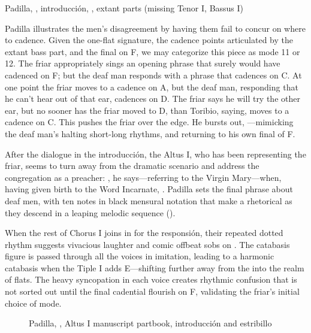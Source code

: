 \begin{exmusic}
  \caption{Padilla, , introducción, , extant parts (missing Tenor I, Bassus I)}
  \label{exmusic:Padilla-Sordo-intro}
\end{exmusic}

Padilla illustrates the men's disagreement by having them fail to concur on where to cadence.
Given the one-flat  signature, the cadence points articulated by the extant bass part, and the final on F, we may categorize this piece as mode 11 or 12.
The friar appropriately sings an opening phrase that surely would have cadenced on F; but the deaf man responds with a phrase that cadences on C.
At one point the friar moves to a cadence on A, but the deaf man, responding that he can't hear out of that ear, cadences on D.
The friar says he will try the other ear, but no sooner has the friar moved to D, than Toribio, saying,  moves to a cadence on C.
This pushes the friar over the edge.
He bursts out, ---mimicking the deaf man's halting short-long rhythms, and returning to his own final of F.

After the dialogue in the introducción, the Altus I, who has been representing the friar, seems to turn away from the dramatic scenario and address the congregation as a preacher: , he says---referring to the Virgin Mary---when, having given birth to the Word Incarnate, .
Padilla sets the final phrase about deaf men, with ten notes in black mensural notation that make a rhetorical  as they descend in a leaping melodic sequence ().

When the rest of Chorus I joins in for the responsión, their repeated dotted rhythm suggests vivacious laughter and comic offbeat sobs on .
The catabasis figure is passed through all the voices in imitation, leading to a harmonic catabasis when the Tiple I adds E\fl{}---shifting further away from the  into the  realm of flats.%
\citXXX[chafe?]
The heavy syncopation in each voice creates rhythmic confusion that is not sorted out until the final cadential flourish on F, validating the friar's initial choice of mode.

\begin{figure}
  \caption{Padilla, , Altus I manuscript partbook, introducción and estribillo}
  \label{figure:Padilla-Sordo-MS-estribillo}
\end{figure}


